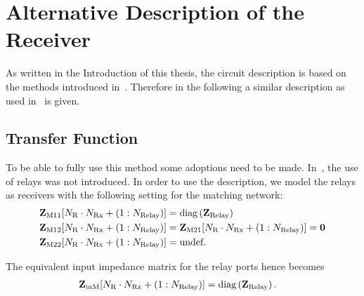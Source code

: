 \chapter{Alternative Description of the Receiver}
\label{sec:nossek}

As written in the Introduction of this thesis, the circuit description is based on the methods introduced in~\cite{Nossek}.
Therefore in the following a similar description as used in~\cite{Nossek} is given. 

\section{Transfer Function}
To be able to fully use this method some adoptions need to be made.
In~\cite{Nossek}, the use of relays was not introduced.
In order to use the description, we model the relays as receivers with the following setting for the matching network:	
\begin{align}
\label{eq:nossek_matching}
\mat{Z}_\text{M11}[N_\text{R}\cdot N_\text{Rx}+\left(1:N_\text{Relay}\right)] &=
	\text{diag}\left(\vec{Z}_\text{Relay}\right)\\
\mat{Z}_\text{M12}[N_\text{R}\cdot N_\text{Rx}+\left(1:N_\text{Relay}\right)] &= 
	\mat{Z}_\text{M21}[N_\text{R}\cdot N_\text{Rx}+\left(1:N_\text{Relay}\right)] = \mat{0}\\
\mat{Z}_\text{M22}[N_\text{R}\cdot N_\text{Rx}+\left(1:N_\text{Relay}\right)] &= \text{undef.}%
\end{align}

The equivalent input impedance matrix for the relay ports hence becomes
\begin{align}
\label{eq:nossek_matching}
\mathbf{Z}_\text{inM}[N_\text{R}\cdot N_\text{Rx}+\left(1:N_\text{Relay}\right)] &= \text{diag}\left(\mathbf{Z}_\text{Relay}\right).
\end{align}
